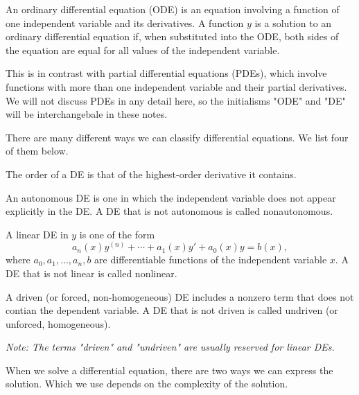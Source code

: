 \documentclass[../m82main.tex]{chapters}
\begin{document}
\begin{definition}
    An ordinary differential equation (ODE) is an equation involving a function of one independent variable and its derivatives.
    A function $y$ is a solution to an ordinary differential equation if, when substituted into the ODE, both sides of the equation are equal for all values of the independent variable.
\end{definition}

This is in contrast with partial differential equations (PDEs), which involve functions with more than one independent variable and their partial derivatives.
We will not discuss PDEs in any detail here, so the initialisms "ODE" and "DE" will be interchangebale in these notes.

There are many different ways we can classify differential equations.
We list four of them below.

\begin{definition}
    The order of a DE is that of the highest-order derivative it contains.
\end{definition}

\begin{definition}
    An autonomous DE is one in which the independent variable does not appear explicitly in the DE.
    A DE that is not autonomous is called nonautonomous.
\end{definition}

\begin{definition}
    A linear DE in $y$ is one of the form
    \[ a_n(x)y^{(n)} + \cdots + a_1(x)y' + a_0(x)y = b(x), \]
    where $a_0, a_1, \ldots, a_n, b$ are differentiable functions of the independent variable $x$.
    A DE that is not linear is called nonlinear.
\end{definition}

\begin{definition}
    A driven (or forced, non-homogeneous) DE includes a nonzero term that does not contian the dependent variable.
    A DE that is not driven is called undriven (or unforced, homogeneous).

    \medskip
    \textit{Note: The terms "driven" and "undriven" are usually reserved for linear DEs.}
\end{definition}

When we solve a differential equation, there are two ways we can express the solution.
Which we use depends on the complexity of the solution.
\end{document}
